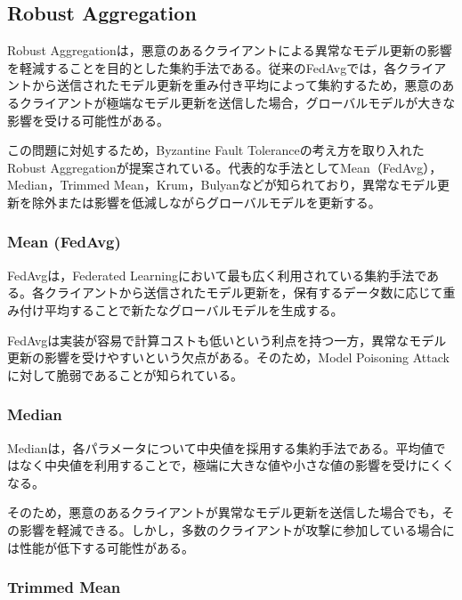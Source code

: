 \documentclass[a4j, twocolumn, dvipdfmx]{jsarticle}  %
\begin{document}
\subsection{Robust Aggregation}
Robust Aggregationは，悪意のあるクライアントによる異常なモデル更新の影響を軽減することを目的とした集約手法である\cite{sagar2023survey}。従来のFedAvgでは，各クライアントから送信されたモデル更新を重み付き平均によって集約するため，悪意のあるクライアントが極端なモデル更新を送信した場合，グローバルモデルが大きな影響を受ける可能性がある。

この問題に対処するため，Byzantine Fault Toleranceの考え方を取り入れたRobust Aggregationが提案されている。代表的な手法としてMean（FedAvg），Median，Trimmed Mean，Krum，Bulyanなどが知られており，異常なモデル更新を除外または影響を低減しながらグローバルモデルを更新する。

\subsubsection{Mean (FedAvg)}

FedAvgは，Federated Learningにおいて最も広く利用されている集約手法である。各クライアントから送信されたモデル更新を，保有するデータ数に応じて重み付け平均することで新たなグローバルモデルを生成する。

FedAvgは実装が容易で計算コストも低いという利点を持つ一方，異常なモデル更新の影響を受けやすいという欠点がある。そのため，Model Poisoning Attackに対して脆弱であることが知られている。

\subsubsection{Median}

Medianは，各パラメータについて中央値を採用する集約手法である。平均値ではなく中央値を利用することで，極端に大きな値や小さな値の影響を受けにくくなる。

そのため，悪意のあるクライアントが異常なモデル更新を送信した場合でも，その影響を軽減できる。しかし，多数のクライアントが攻撃に参加している場合には性能が低下する可能性がある。

\subsubsection{Trimmed Mean}
\end{document}

